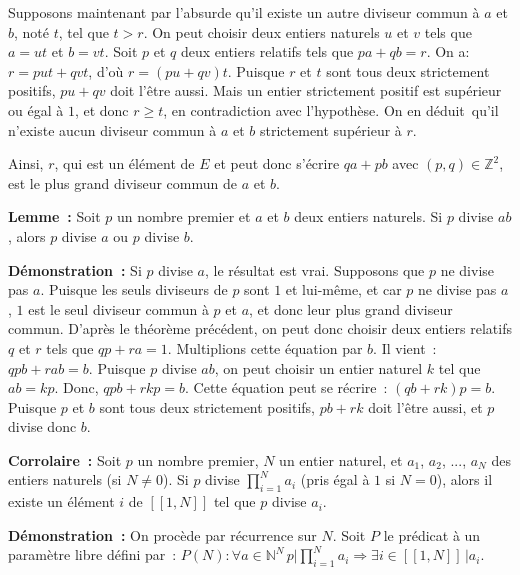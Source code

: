 Supposons maintenant par l'absurde qu'il existe un autre diviseur commun à $a$ et $b$, noté $t$, tel que $t > r$. 
On peut choisir deux entiers naturels $u$ et $v$ tels que $a = u t$ et $b = v t$. 
Soit $p$ et $q$ deux entiers relatifs tels que $p a + q b = r$. 
On a: $r = p u t + q v t$, d'où $r = (p u + q v) t$. 
Puisque $r$ et $t$ sont tous deux strictement positifs, $p u + q v$ doit l'être aussi. 
Mais un entier strictement positif est supérieur ou égal à $1$, et donc $r \geq t$, en contradiction avec l'hypothèse. 
On en déduit qu'il n'existe aucun diviseur commun à $a$ et $b$ strictement supérieur à $r$.

Ainsi, $r$, qui est un élément de $E$ et peut donc s'écrire $q a + p b$ avec $(p, q) \in \mathbb{Z}^2$, est le plus grand diviseur commun de $a$ et $b$.

\done

\medskip

\noindent\textbf{Lemme :} 
Soit $p$ un nombre premier et $a$ et $b$ deux entiers naturels. 
Si $p$ divise $a b$, alors $p$ divise $a$ ou $p$ divise $b$.

\medskip

\noindent\textbf{Démonstration :} 
Si $p$ divise $a$, le résultat est vrai. 
Supposons que $p$ ne divise pas $a$. 
Puisque les seuls diviseurs de $p$ sont $1$ et lui-même, et car $p$ ne divise pas $a$, $1$ est le seul diviseur commun à $p$ et $a$, et donc leur plus grand diviseur commun. 
D'après le théorème précédent, on peut donc choisir deux entiers relatifs $q$ et $r$ tels que $q p + r a = 1$. 
Multiplions cette équation par $b$. 
Il vient : $q p b + r a b = b$. 
Puisque $p$ divise $a b$, on peut choisir un entier naturel $k$ tel que $a b = k p$. 
Donc, $q p b + r k p = b$. 
Cette équation peut se récrire : $(q b + r k) p = b$. 
Puisque $p$ et $b$ sont tous deux strictement positifs, $p b + r k$ doit l'être aussi, et $p$ divise donc $b$.

\done

\bigskip
\noindent\textbf{Corrolaire :} 
Soit $p$ un nombre premier, $N$ un entier naturel, et $a_1$, $a_2$, ..., $a_N$ des entiers naturels (si $N \neq 0$). 
Si $p$ divise $\prod_{i=1}^N a_i$ (pris égal à $1$ si $N = 0$), alors il existe un élément $i$ de $[\![1,N]\!]$ tel que $p$ divise $a_i$.

\medskip

\noindent\textbf{Démonstration :} 
On procède par récurrence sur $N$. 
Soit $P$ le prédicat à un paramètre libre défini par : $P(N): \forall a \in \mathbb{N}^N \, p \vert \prod_{i=1}^N a_i \Rightarrow \exists i \in [\![1,N]\!] \, \vert a_i$.

